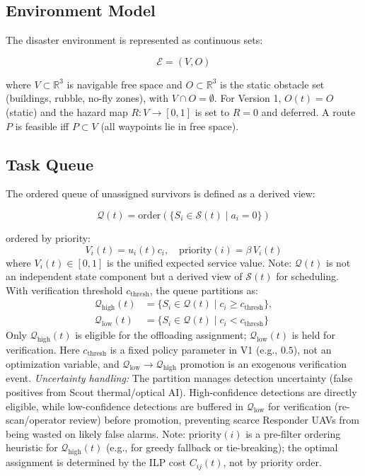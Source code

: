 \documentclass[conference]{IEEEtran}
\begin{document}
\subsection{Environment Model}
The disaster environment is represented as continuous sets:

\begin{equation}
\mathcal{E} = (V, O)
\end{equation}

where $V \subset \mathbb{R}^3$ is navigable free space and $O \subset \mathbb{R}^3$ is the static obstacle set (buildings, rubble, no-fly zones), with $V \cap O = \emptyset$. For Version 1, $O(t)=O$ (static) and the hazard map $R: V \rightarrow [0,1]$ is set to $R=0$ and deferred. A route $P$ is feasible iff $P \subset V$ (all waypoints lie in free space).

\subsection{Task Queue}
The ordered queue of unassigned survivors is defined as a derived view:

\begin{equation}
\mathcal{Q}(t) = \text{order}(\{ S_i \in \mathcal{S}(t) \mid a_i = 0 \})
\end{equation}

ordered by priority:
\begin{equation}
V_i(t)=u_i(t)c_i, \quad \text{priority}(i)=\beta\,V_i(t)
\end{equation}
where $V_i(t)\in[0,1]$ is the unified expected service value.
Note: $\mathcal{Q}(t)$ is not an independent state component but a derived view of $\mathcal{S}(t)$ for scheduling. With verification threshold $c_{\text{thresh}}$, the queue partitions as:
\begin{align}
\mathcal{Q}_{\text{high}}(t) &= \{ S_i \in \mathcal{Q}(t) \mid c_i \geq c_{\text{thresh}} \}, \\
\mathcal{Q}_{\text{low}}(t) &= \{ S_i \in \mathcal{Q}(t) \mid c_i < c_{\text{thresh}} \}
\end{align}
Only $\mathcal{Q}_{\text{high}}(t)$ is eligible for the offloading assignment; $\mathcal{Q}_{\text{low}}(t)$ is held for verification. Here $c_{\text{thresh}}$ is a fixed policy parameter in V1 (e.g., $0.5$), not an optimization variable, and $\mathcal{Q}_{\text{low}}\to\mathcal{Q}_{\text{high}}$ promotion is an exogenous verification event. \textit{Uncertainty handling:} The partition manages detection uncertainty (false positives from Scout thermal/optical AI). High-confidence detections are directly eligible, while low-confidence detections are buffered in $\mathcal{Q}_{\text{low}}$ for verification (re-scan/operator review) before promotion, preventing scarce Responder UAVs from being wasted on likely false alarms. Note: $\text{priority}(i)$ is a pre-filter ordering heuristic for $\mathcal{Q}_{\text{high}}(t)$ (e.g., for greedy fallback or tie-breaking); the optimal assignment is determined by the ILP cost $C_{ij}(t)$, not by priority order.
\end{document}
